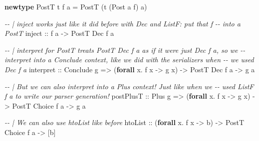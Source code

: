 \documentclass[]{article}
\newenvironment{Shaded}{}{}
\newcommand{\CommentTok}[1]{\textcolor[rgb]{0.38,0.63,0.69}{\textit{#1}}}
\newcommand{\DataTypeTok}[1]{\textcolor[rgb]{0.56,0.13,0.00}{#1}}
\newcommand{\KeywordTok}[1]{\textcolor[rgb]{0.00,0.44,0.13}{\textbf{#1}}}
\newcommand{\NormalTok}[1]{#1}
\newcommand{\OperatorTok}[1]{\textcolor[rgb]{0.40,0.40,0.40}{#1}}
\newcommand{\OtherTok}[1]{\textcolor[rgb]{0.00,0.44,0.13}{#1}}
\begin{document}
\begin{Shaded}
\begin{Highlighting}[]
\KeywordTok{newtype} \DataTypeTok{PostT}\NormalTok{ t f a }\OtherTok{=} \DataTypeTok{PostT}\NormalTok{ (t (}\DataTypeTok{Post}\NormalTok{ a f) a)}

\CommentTok{{-}{-} | \textasciigrave{}inject\textasciigrave{} works just like it did before with \textasciigrave{}Dec\textasciigrave{} and \textasciigrave{}ListF\textasciigrave{}: put that \textasciigrave{}f\textasciigrave{}}
\CommentTok{{-}{-} into a \textasciigrave{}PostT\textasciigrave{}}
\OtherTok{inject ::}\NormalTok{ f a }\OtherTok{{-}\textgreater{}} \DataTypeTok{PostT} \DataTypeTok{Dec}\NormalTok{ f a}

\CommentTok{{-}{-} | interpret for PostT treats \textasciigrave{}PostT Dec f a\textasciigrave{} as if it were just \textasciigrave{}Dec f a\textasciigrave{}, so we}
\CommentTok{{-}{-} interpret into a \textasciigrave{}Conclude\textasciigrave{} context, like we did with the serializers when}
\CommentTok{{-}{-} we used \textasciigrave{}Dec f a\textasciigrave{}}
\NormalTok{interpret}
\OtherTok{    ::} \DataTypeTok{Conclude}\NormalTok{ g}
    \OtherTok{=\textgreater{}}\NormalTok{ (}\KeywordTok{forall}\NormalTok{ x}\OperatorTok{.}\NormalTok{ f x }\OtherTok{{-}\textgreater{}}\NormalTok{ g x)}
    \OtherTok{{-}\textgreater{}} \DataTypeTok{PostT} \DataTypeTok{Dec}\NormalTok{ f a}
    \OtherTok{{-}\textgreater{}}\NormalTok{ g a}

\CommentTok{{-}{-} | But we can also interpret into a \textasciigrave{}Plus\textasciigrave{} context!  Just like when we}
\CommentTok{{-}{-} used \textasciigrave{}ListF f a\textasciigrave{} to write our parser generation!}
\NormalTok{postPlusT}
\OtherTok{    ::} \DataTypeTok{Plus}\NormalTok{ g}
    \OtherTok{=\textgreater{}}\NormalTok{ (}\KeywordTok{forall}\NormalTok{ x}\OperatorTok{.}\NormalTok{ f x }\OtherTok{{-}\textgreater{}}\NormalTok{ g x)}
    \OtherTok{{-}\textgreater{}} \DataTypeTok{PostT} \DataTypeTok{Choice}\NormalTok{ f a}
    \OtherTok{{-}\textgreater{}}\NormalTok{ g a}

\CommentTok{{-}{-} | We can also use htoList like before}
\NormalTok{htoList}
\OtherTok{    ::}\NormalTok{ (}\KeywordTok{forall}\NormalTok{ x}\OperatorTok{.}\NormalTok{ f x }\OtherTok{{-}\textgreater{}}\NormalTok{ b)}
    \OtherTok{{-}\textgreater{}} \DataTypeTok{PostT} \DataTypeTok{Choice}\NormalTok{ f a}
    \OtherTok{{-}\textgreater{}}\NormalTok{ [b]}
\end{Highlighting}
\end{Shaded}
\end{document}
